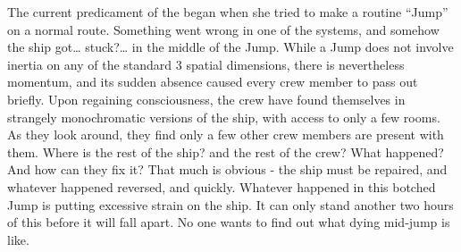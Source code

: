 \documentclass[blue]{TMFHope}
\begin{document}
The current predicament of the \pNew{} began when she tried to make a routine ``Jump'' on a normal route. Something went wrong in one of the systems, and somehow the ship got\ldots{} stuck?\ldots{} in the middle of the Jump. While a Jump does not involve inertia on any of the standard 3 spatial dimensions, there is nevertheless momentum, and its sudden absence caused every crew member to pass out briefly. Upon regaining consciousness, the crew have found themselves in strangely monochromatic versions of the ship, with access to only a few rooms. As they look around, they find only a few other crew members are present with them. Where is the rest of the ship? and the rest of the crew? What happened? And how can they fix it? That much is obvious - the ship must be repaired, and whatever happened reversed, and quickly. Whatever happened in this botched Jump is putting excessive strain on the ship. It can only stand another two hours of this before it will fall apart. No one wants to find out what dying mid-jump is like.
\end{document}
